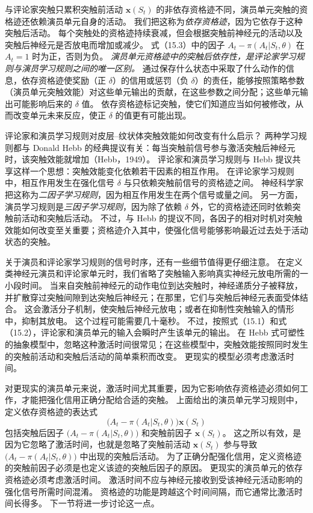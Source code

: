 \documentclass[UTF8, 12pt, fontset=fandol, oneside]{ctexart}
\begin{document}
与评论家突触只累积突触前活动 $\mathbf{x}(S_t)$ 的非依存资格迹不同，演员单元突触的资格迹还依赖演员单元自身的活动。
我们把这称为\emph{依存资格迹}，因为它依存于这种突触后活动。
每个突触处的资格迹持续衰减，但会根据突触前神经元的活动以及突触后神经元是否放电而增加或减少。
式（15.3）中的因子 $A_t-\pi(A_t|S_t,\theta)$ 在 $A_t=1$ 时为正，否则为负。
\emph{演员单元资格迹中的突触后依存性，是评论家学习规则与演员学习规则之间的唯一区别。}
通过保存什么状态中采取了什么动作的信息，依存资格迹使奖励（正 $\delta$）的信用或惩罚（负 $\delta$）的责任，能够按照策略参数（演员单元突触效能）对这些单元输出的贡献，在这些参数之间分配；这些单元输出可能影响后来的 $\delta$ 值。
依存资格迹标记突触，使它们知道应当如何被修改，从而改变单元未来反应，使正 $\delta$ 的值更有可能出现。

评论家和演员学习规则对皮层--纹状体突触效能如何改变有什么启示？
两种学习规则都与 Donald Hebb 的经典提议有关：每当突触前信号参与激活突触后神经元时，该突触效能就增加（Hebb，1949）。
评论家和演员学习规则与 Hebb 提议共享这样一个思想：突触效能变化依赖若干因素的相互作用。
在评论家学习规则中，相互作用发生在强化信号 $\delta$ 与只依赖突触前信号的资格迹之间。
神经科学家把这称为\emph{二因子学习规则}，因为相互作用发生在两个信号或量之间。
另一方面，演员学习规则是\emph{三因子学习规则}，因为除了依赖 $\delta$ 外，它的资格迹还同时依赖突触前活动和突触后活动。
不过，与 Hebb 的提议不同，各因子的相对时机对突触效能如何改变至关重要；资格迹介入其中，使强化信号能够影响最近过去处于活动状态的突触。

关于演员和评论家学习规则的信号时序，还有一些细节值得更仔细注意。
在定义类神经元演员和评论家单元时，我们省略了突触输入影响真实神经元放电所需的一小段时间。
当来自突触前神经元的动作电位到达突触时，神经递质分子被释放，并扩散穿过突触间隙到达突触后神经元；在那里，它们与突触后神经元表面受体结合。
这会激活分子机制，使突触后神经元放电；或者在抑制性突触输入的情形中，抑制其放电。
这个过程可能需要几十毫秒。
不过，按照式（15.1）和式（15.2），评论家和演员单元的输入会瞬时产生该单元的输出。
在 Hebb 式可塑性的抽象模型中，忽略这种激活时间很常见；在这些模型中，突触效能按照同时发生的突触前活动和突触后活动的简单乘积而改变。
更现实的模型必须考虑激活时间。

对更现实的演员单元来说，激活时间尤其重要，因为它影响依存资格迹必须如何工作，才能把强化信用正确分配给合适的突触。
上面给出的演员单元学习规则中，定义依存资格迹的表达式
\[
\big(A_t-\pi(A_t|S_t,\theta)\big)\mathbf{x}(S_t)
\]
包括突触后因子 $\big(A_t-\pi(A_t|S_t,\theta)\big)$ 和突触前因子 $\mathbf{x}(S_t)$。
这之所以有效，是因为它忽略了激活时间，也就是忽略了突触前活动 $\mathbf{x}(S_t)$ 参与导致 $\big(A_t-\pi(A_t|S_t,\theta)\big)$ 中出现的突触后活动。
为了正确分配强化信用，定义资格迹的突触前因子必须是也定义该迹的突触后因子的原因。
更现实的演员单元的依存资格迹必须考虑激活时间。
激活时间不应与神经元接收到受该神经元活动影响的强化信号所需时间混淆。
资格迹的功能是跨越这个时间间隔，而它通常比激活时间长得多。
下一节将进一步讨论这一点。
\end{document}

